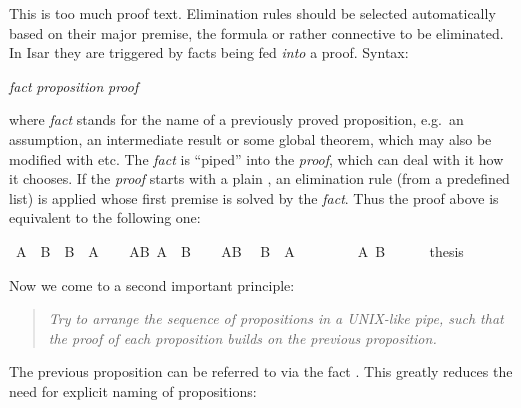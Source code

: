 \begin{isabellebody}
\begin{isamarkuptext}
This is too much proof text. Elimination rules should be selected
automatically based on their major premise, the formula or rather connective
to be eliminated. In Isar they are triggered by facts being fed
\emph{into} a proof. Syntax:
\begin{center}
 \emph{fact}  \emph{proposition} \emph{proof}
\end{center}
where \emph{fact} stands for the name of a previously proved
proposition, e.g.\ an assumption, an intermediate result or some global
theorem, which may also be modified with  etc.
The \emph{fact} is ``piped'' into the \emph{proof}, which can deal with it
how it chooses. If the \emph{proof} starts with a plain ,
an elimination rule (from a predefined list) is applied
whose first premise is solved by the \emph{fact}. Thus the proof above
is equivalent to the following one:%
\end{isamarkuptext}%
\isamarkupfalse%
\ {\isachardoublequote}A\ {\isasymand}\ B\ {\isasymlongrightarrow}\ B\ {\isasymand}\ A{\isachardoublequote}\isanewline
%
\isadelimproof
%
\endisadelimproof
%
\isatagproof
\isamarkupfalse%
\isanewline
\ \ \isamarkupfalse%
\ AB{\isacharcolon}\ {\isachardoublequote}A\ {\isasymand}\ B{\isachardoublequote}\isanewline
\ \ \isamarkupfalse%
\ AB\ \isamarkupfalse%
\ {\isachardoublequote}B\ {\isasymand}\ A{\isachardoublequote}\isanewline
\ \ \isamarkupfalse%
\isanewline
\ \ \ \ \isamarkupfalse%
\ {\isachardoublequote}A{\isachardoublequote}\ {\isachardoublequote}B{\isachardoublequote}\isanewline
\ \ \ \ \isamarkupfalse%
\ {\isacharquery}thesis\ \isamarkupfalse%
\isacommand{{\isachardot}{\isachardot}}\isanewline
\ \ \isamarkupfalse%
\isanewline
\isamarkupfalse%
%
\endisatagproof
{\isafoldproof}%
%
\isadelimproof
%
\endisadelimproof
\isamarkuptrue%
%
\begin{isamarkuptext}%
Now we come to a second important principle:
\begin{quote}\em
Try to arrange the sequence of propositions in a UNIX-like pipe,
such that the proof of each proposition builds on the previous proposition.
\end{quote}
The previous proposition can be referred to via the fact .
This greatly reduces the need for explicit naming of propositions:%
\end{isamarkuptext}%
\isamarkupfalse%

\end{isabellebody}

